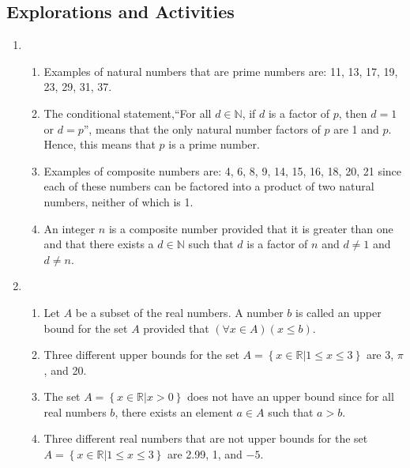 \subsection*{Explorations and Activities}
\setcounter{oldenumi}{\theenumi}
\begin{enumerate} \setcounter{enumi}{\theoldenumi}
\item \begin{enumerate}
\item Examples of natural numbers that are prime numbers are:  11, 13, 17, 19, 23, 29, 31, 37.

\item The conditional statement,``For all  $d \in \mathbb{N}$, if  $d$  is a factor of  $p$, then  $d = 1$ or  $d = p$'', means that the only natural number factors of  $p$  are  1  and  $p$.  Hence, this means that  $p$  is a prime number.

\item Examples of composite numbers are:  4, 6, 8, 9, 14, 15, 16, 18, 20, 21 since each of these numbers can be factored into a product of two natural numbers, neither of which is 1.

\item An integer  $n$ is a composite number provided that it is greater than one and that there exists a $d \in \mathbb{N}$  such that  $d$  is a factor of  $n$  and  $d \ne 1$ and  $d \ne n$.
\end{enumerate}



\item \begin{enumerate}
\item Let  $A$  be a subset of the real numbers.  A number  $b$  is called an upper bound for the set  $A$ provided that $\left( \forall x \in A\right) \left( x \leq b \right)$.

\item Three different upper bounds for the set  
$A = \left\{ {\left. {x \in \mathbb{R} } \right| 1 \leq x \leq 3} \right\}$
 are  3, $\pi $, and 20.

\item The set  $A = \left\{ {x \in \mathbb{R}\left.   \right| x > 0} \right\}$
 does not have an upper bound since for all real numbers  $b$, there exists an element  $a \in A$
 such that  $a > b$.

\item Three different real numbers that are not upper bounds for the set  
$A = \left\{ {\left. {x \in \mathbb{R} } \right| 1 \leq x \leq 3} \right\}$
 are 2.99, 1, and $-5$.


\end{enumerate}
\end{enumerate}
